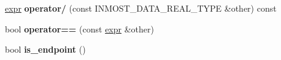 \begin{DoxyCompactItemize}
\item 
\hypertarget{classINMOST_1_1expr_a8dcde01b111bcd61f73a0d2835643f7d}{\hyperlink{classINMOST_1_1expr}{expr} {\bfseries operator/} (const I\-N\-M\-O\-S\-T\-\_\-\-D\-A\-T\-A\-\_\-\-R\-E\-A\-L\-\_\-\-T\-Y\-P\-E \&other) const }\label{classINMOST_1_1expr_a8dcde01b111bcd61f73a0d2835643f7d}

\item 
\hypertarget{classINMOST_1_1expr_a27b38872163f318d3693a6a92d480bcc}{bool {\bfseries operator==} (const \hyperlink{classINMOST_1_1expr}{expr} \&other)}\label{classINMOST_1_1expr_a27b38872163f318d3693a6a92d480bcc}

\item 
\hypertarget{classINMOST_1_1expr_ade6b44d2374c0563f7e811a99cfeea6c}{bool {\bfseries is\-\_\-endpoint} ()}\label{classINMOST_1_1expr_ade6b44d2374c0563f7e811a99cfeea6c}

\end{DoxyCompactItemize}
